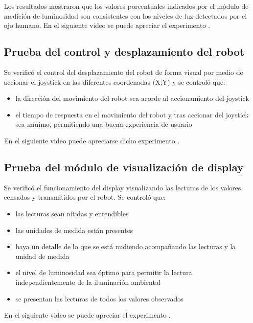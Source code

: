 Los resultados mostraron que los valores porcentuales indicados por el módulo de medición de luminosidad son consistentes con los niveles de luz detectados por el ojo humano. En el siguiente video se puede apreciar el experimento \cite{Video_Prueba_Luminosidad}.

\subsection{Prueba del control y desplazamiento del robot}

Se verificó el control del desplazamiento del robot de forma visual por medio de accionar el joystick en las diferentes coordenadas (X;Y) y se controló que:

\begin{itemize}
	\item la dirección del movimiento del robot sea acorde al accionamiento del joystick
	\item el tiempo de respuesta en el movimiento del robot y tras accionar del joystick sea mínimo, permitiendo una buena experiencia de usuario
\end{itemize}

En el siguiente video puede apreciarse dicho experimento \cite{Video_Prueba_Movimiento}.


\subsection{Prueba del módulo de visualización de display}

Se verificó el funcionamiento del display visualizando las lecturas de los valores censados y transmitidos por el robot. Se controló que:

\begin{itemize}
	\item las lecturas sean nítidas y entendibles
	\item las unidades de medida están presentes
	\item haya un detalle de lo que se está midiendo acompañando las lecturas y la unidad de medida
	\item el nivel de luminosidad sea óptimo para permitir la lectura independientemente de la iluminación ambiental
	\item se presentan las lecturas de todos los valores observados
\end{itemize}

En el siguiente video se puede apreciar el experimento \cite{Video_Prueba_Visualizacion_Display}.

